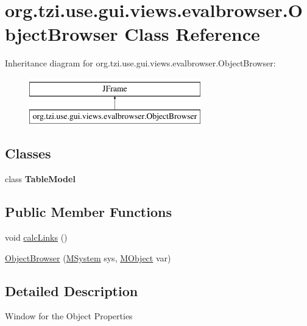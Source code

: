 \hypertarget{classorg_1_1tzi_1_1use_1_1gui_1_1views_1_1evalbrowser_1_1_object_browser}{\section{org.\-tzi.\-use.\-gui.\-views.\-evalbrowser.\-Object\-Browser Class Reference}
\label{classorg_1_1tzi_1_1use_1_1gui_1_1views_1_1evalbrowser_1_1_object_browser}
}
Inheritance diagram for org.\-tzi.\-use.\-gui.\-views.\-evalbrowser.\-Object\-Browser\-:\begin{figure}[H]
\begin{center}
\leavevmode
\includegraphics[height=2.000000cm]{classorg_1_1tzi_1_1use_1_1gui_1_1views_1_1evalbrowser_1_1_object_browser}
\end{center}
\end{figure}
\subsection*{Classes}
\begin{DoxyCompactItemize}
\item 
class {\bfseries Table\-Model}
\end{DoxyCompactItemize}
\subsection*{Public Member Functions}
\begin{DoxyCompactItemize}
\item 
void \hyperlink{classorg_1_1tzi_1_1use_1_1gui_1_1views_1_1evalbrowser_1_1_object_browser_ad29fda8c6036c84c1ccde625ea633bb1}{calc\-Links} ()
\item 
\hyperlink{classorg_1_1tzi_1_1use_1_1gui_1_1views_1_1evalbrowser_1_1_object_browser_a929c076721182ae8514133b3694b9cd7}{Object\-Browser} (\hyperlink{classorg_1_1tzi_1_1use_1_1uml_1_1sys_1_1_m_system}{M\-System} sys, \hyperlink{interfaceorg_1_1tzi_1_1use_1_1uml_1_1sys_1_1_m_object}{M\-Object} var)
\end{DoxyCompactItemize}


\subsection{Detailed Description}
Window for the Object Properties 

